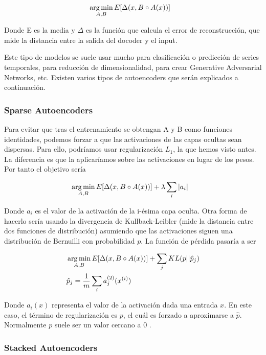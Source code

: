 \begin{align}
	&\operatorname*{arg\,min}_{A,B}E[\Delta (x, B \circ A(x))]
\end{align}

Donde E es la media y $\Delta$ es la función que calcula el error de reconstrucción, que mide la distancia entre la salida del docoder y el input.\newline

Este tipo de modelos se suele usar mucho para clasificación o predicción de series temporales, para reducción de dimensionalidad, para crear Generative Adversarial Networks, etc. Existen varios tipos de autoencoders que serán explicados a continuación.

\subsubsection{Sparse Autoencoders}

Para evitar que tras el entrenamiento se obtengan A y B como funciones identidades, podemos forzar a que las activaciones de las capas ocultas sean dispersas. Para ello, podríamos usar regularización $L_1$, la que hemos visto antes. La diferencia es que la aplicaríamos sobre las activaciones en lugar de los pesos. Por tanto el objetivo sería

\begin{align}
	&\operatorname*{arg\,min}_{A,B}E[\Delta (x, B \circ A(x))] + \lambda \sum_i |a_i|
\end{align}

Donde $a_i$ es el valor de la activación de la i-ésima capa oculta. Otra forma de hacerlo sería usando la divergencia de Kullback-Leibler (mide la distancia entre dos funciones de distribución) asumiendo que las activaciones siguen una distribución de Bernuilli con probabilidad $p$. La función de pérdida pasaría a ser

\begin{align}
	&\operatorname*{arg\,min}_{A,B}E[\Delta (x, B \circ A(x))] + \sum_j KL(p||\hat{p}_j)\\
	&\hat{p}_j = \frac{1}{m} \sum_i a_j^{(2)}(x^{(i)})
\end{align}

Donde $a_i(x)$ representa el valor de la activación dada una entrada $x$. En este caso, el término de regularización es $p$, el cuál es forzado a aproximarse a $\hat{p}$. Normalmente $p$ suele ser un valor cercano a 0 \cite{ng, bank2020autoencoders}.

\subsubsection{Stacked Autoencoders}

